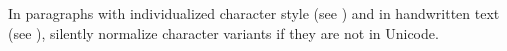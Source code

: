 \documentclass[fontsize=11pt, paper=a4, 
DIV15,
headings=normal,
parskip=half-, 
numbers=noenddot]{scrartcl}
\begin{document}
\begin{clarification}
In paragraphs with individualized character style (see ) and in handwritten text (see ), silently normalize character variants if they are not in Unicode.
\end{clarification}

\end{document}
